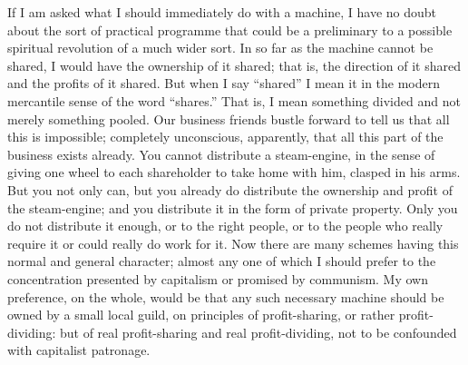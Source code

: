 \documentclass{book}
\begin{document}
If I am asked what I should immediately do with a machine, I have no doubt about the sort of practical programme that could be a preliminary to a possible spiritual revolution of a much wider sort. In so far as the machine cannot be shared, I would have the ownership of it shared; that is, the direction of it shared and the profits of it shared. But when I say “shared” I mean it in the modern mercantile sense of the word “shares.” That is, I mean something divided and not merely something pooled. Our business friends bustle forward to tell us that all this is impossible; completely unconscious, apparently, that all this part of the business exists already. You cannot distribute a steam-engine, in the sense of giving one wheel to each shareholder to take home with him, clasped in his arms. But you not only can, but you already do distribute the ownership and profit of the steam-engine; and you distribute it in the form of private property. Only you do not distribute it enough, or to the right people, or to the people who really require it or could really do work for it. Now there are many schemes having this normal and general character; almost any one of which I should prefer to the concentration presented by capitalism or promised by communism. My own preference, on the whole, would be that any such necessary machine should be owned by a small local guild, on principles of profit-sharing, or rather profit-dividing: but of real profit-sharing and real profit-dividing, not to be confounded with capitalist patronage.
\end{document}
